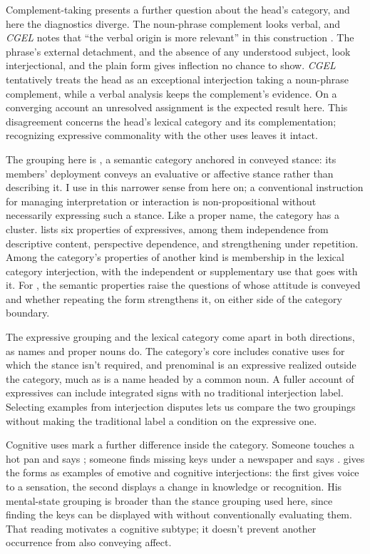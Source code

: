 \documentclass[12pt]{article}
\begin{document}
Complement-taking  presents a further
question about the head's category, and here the diagnostics diverge. The
noun-phrase complement looks verbal, and \textit{CGEL} notes that
\enquote{the verbal origin is more relevant} in this construction
\citep[1361 n.~70]{HuddlestonPullum2002}. The
phrase's external detachment, and the absence of any understood subject,
look interjectional, and the plain form gives inflection no chance to show.
\textit{CGEL} tentatively treats the head as an exceptional interjection
taking a noun-phrase complement, while a verbal analysis keeps the complement's evidence. On a converging
account an unresolved assignment is the expected result here. This disagreement concerns the head's lexical
category and its complementation; recognizing expressive commonality with
the other  uses leaves it intact.

The grouping here is , a semantic category
anchored in conveyed stance: its members' deployment conveys an evaluative
or affective stance rather than describing it. I use  in
this narrower sense from here on; a conventional instruction for managing
interpretation or interaction is non-propositional without necessarily
expressing such a stance. Like a proper name, the category has a
cluster. \textcite[166--167]{potts2007} lists six properties of
expressives, among them independence from descriptive content, perspective
dependence, and strengthening under repetition. Among the category's
properties of another kind is membership in the lexical category
interjection, with the independent or supplementary use that goes with it. For , the
semantic properties raise the questions of whose attitude is conveyed and
whether repeating the form strengthens it, on either side of the category
boundary.

The expressive grouping and the lexical category come apart in both
directions, as names and proper nouns do. The category's core includes
conative uses for which the stance isn't required, and prenominal
 is an expressive realized outside the category, much as
 is a name headed by a common noun. A fuller account of expressives can include integrated signs
with no traditional interjection label. Selecting examples from interjection
disputes lets us compare the two groupings without making the traditional
label a condition on the expressive one.

Cognitive uses mark a further difference inside the category. Someone
touches a hot pan and says ; someone finds missing keys
under a newspaper and says . \textcite[113]{ameka1992}
gives the forms as examples of emotive and cognitive interjections: the
first gives voice to a sensation, the second displays a change in
knowledge or recognition. His mental-state grouping is broader than the
stance grouping used here, since finding the keys can be displayed with
 without conventionally evaluating them. That reading
motivates a cognitive subtype; it doesn't prevent another occurrence from
also conveying affect.
\end{document}
